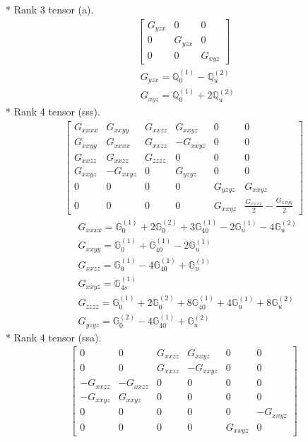 \documentclass[fleqn,8pt,landscape]{jsarticle}
\begin{document}
* Rank 3 tensor (a).
\begin{align*}
\begin{bmatrix} G_{yzx} & 0 & 0 \\ 0 & G_{yzx} & 0 \\ 0 & 0 & G_{xyz} \end{bmatrix}
\end{align*}
\begin{align*}
& G_{yzx} = \mathbb{Q}_{0}^{(1)} - \mathbb{Q}_{u}^{(2)} \\
& G_{xyz} = \mathbb{Q}_{0}^{(1)} + 2 \mathbb{Q}_{u}^{(2)}
\end{align*}
* Rank 4 tensor (sss).
\begin{align*}
\begin{bmatrix} G_{xxxx} & G_{xxyy} & G_{xxzz} & G_{xxyz} & 0 & 0 \\ G_{xxyy} & G_{xxxx} & G_{xxzz} & - G_{xxyz} & 0 & 0 \\ G_{xxzz} & G_{xxzz} & G_{zzzz} & 0 & 0 & 0 \\ G_{xxyz} & - G_{xxyz} & 0 & G_{yzyz} & 0 & 0 \\ 0 & 0 & 0 & 0 & G_{yzyz} & G_{xxyz} \\ 0 & 0 & 0 & 0 & G_{xxyz} & \frac{G_{xxxx}}{2} - \frac{G_{xxyy}}{2} \end{bmatrix}
\end{align*}
\begin{align*}
& G_{xxxx} = \mathbb{G}_{0}^{(1)} + 2 \mathbb{G}_{0}^{(2)} + 3 \mathbb{G}_{40}^{(1)} - 2 \mathbb{G}_{u}^{(1)} - 4 \mathbb{G}_{u}^{(2)} \\
& G_{xxyy} = \mathbb{G}_{0}^{(1)} + \mathbb{G}_{40}^{(1)} - 2 \mathbb{G}_{u}^{(1)} \\
& G_{xxzz} = \mathbb{G}_{0}^{(1)} - 4 \mathbb{G}_{40}^{(1)} + \mathbb{G}_{u}^{(1)} \\
& G_{xxyz} = \mathbb{G}_{4s}^{(1)} \\
& G_{zzzz} = \mathbb{G}_{0}^{(1)} + 2 \mathbb{G}_{0}^{(2)} + 8 \mathbb{G}_{40}^{(1)} + 4 \mathbb{G}_{u}^{(1)} + 8 \mathbb{G}_{u}^{(2)} \\
& G_{yzyz} = \mathbb{G}_{0}^{(2)} - 4 \mathbb{G}_{40}^{(1)} + \mathbb{G}_{u}^{(2)}
\end{align*}
* Rank 4 tensor (ssa).
\begin{align*}
\begin{bmatrix} 0 & 0 & G_{xxzz} & G_{xxyz} & 0 & 0 \\ 0 & 0 & G_{xxzz} & - G_{xxyz} & 0 & 0 \\ - G_{xxzz} & - G_{xxzz} & 0 & 0 & 0 & 0 \\ - G_{xxyz} & G_{xxyz} & 0 & 0 & 0 & 0 \\ 0 & 0 & 0 & 0 & 0 & - G_{xxyz} \\ 0 & 0 & 0 & 0 & G_{xxyz} & 0 \end{bmatrix}
\end{align*}
\end{document}
